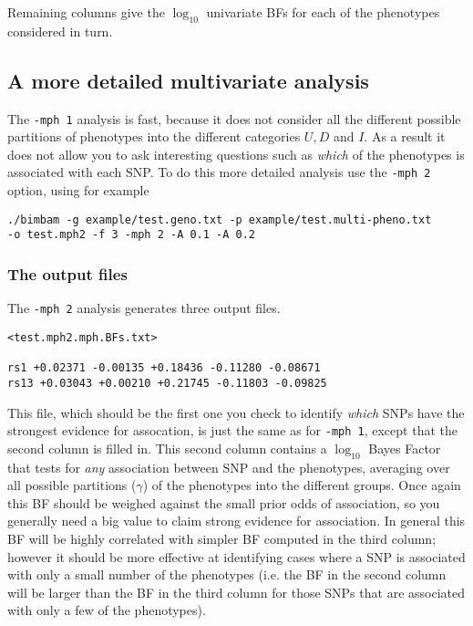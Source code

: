 \documentclass[11pt]{article}
\def\logten{\log_{10}}
\begin{document}
Remaining columns give the $\logten$ univariate BFs for each of the phenotypes considered in turn.

\subsection{A more detailed multivariate analysis}

The {\tt -mph 1} analysis is fast, because it does not consider all the different possible partitions of phenotypes into the different categories $U,D$ and $I$. As a result
it does not allow you to ask interesting questions such as {\it which} of the phenotypes is associated with each SNP.  To do this more detailed analysis use the {\tt -mph 2} option, using for example

\begin{verbatim}
./bimbam -g example/test.geno.txt -p example/test.multi-pheno.txt 
-o test.mph2 -f 3 -mph 2 -A 0.1 -A 0.2
\end{verbatim} 

\subsubsection{The output files}

The {\tt -mph 2} analysis generates three output files.

\begin{verbatim}
<test.mph2.mph.BFs.txt>

rs1 +0.02371 -0.00135 +0.18436 -0.11280 -0.08671
rs13 +0.03043 +0.00210 +0.21745 -0.11803 -0.09825
\end{verbatim}

This file, which should be the first one you check to identify {\it which} SNPs have the strongest evidence for assocation, is just the same as for {\tt -mph 1}, except that the second column is filled in. This second
column contains
a $\logten$ Bayes Factor that tests for {\it any} association between SNP and the phenotypes, averaging over all possible partitions ($\gamma$) of the phenotypes into the different groups. Once again this BF should be weighed against the small prior odds of association, so you generally need a big value to claim strong evidence for association. In general this BF will be highly correlated with simpler BF computed in the third column; however it should be
more effective at identifying cases where a SNP is associated with only a small number of the phenotypes (i.e. the BF in the second column will be larger than the BF in the third column for those SNPs that are associated with only a few of the phenotypes).
\end{document}

